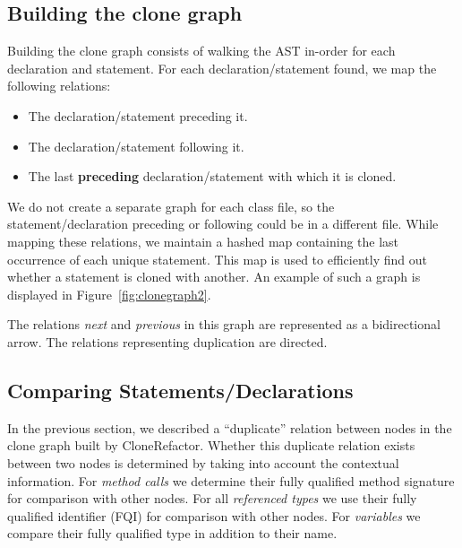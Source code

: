 \documentclass[conference]{IEEEtran}
\begin{document}
\subsection{Building the clone graph}\label{sec:buildingclonegraph}
Building the clone graph consists of walking the AST in-order for each declaration and statement. For each declaration/statement found, we map the following relations:
\begin{itemize}
  \item The declaration/statement preceding it.
  \item The declaration/statement following it.
  \item The last \textbf{preceding} declaration/statement with which it is cloned.
\end{itemize}
We do not create a separate graph for each class file, so the statement/declaration preceding or following could be in a different file. While mapping these relations, we maintain a hashed map containing the last occurrence of each unique statement. This map is used to efficiently find out whether a statement is cloned with another. An example of such a graph is displayed in Figure~\ref{fig:clonegraph2}.


The relations \textit{next} and \textit{previous} in this graph are represented as a bidirectional arrow. The relations representing duplication are directed. %

\subsection{Comparing Statements/Declarations} \label{sec:comparingstuff}
In the previous section, we described a ``duplicate'' relation between nodes in the clone graph built by CloneRefactor. Whether this duplicate relation exists between two nodes is determined by taking into account the contextual information. For \textit{method calls} we determine their fully qualified method signature for comparison with other nodes. For all \textit{referenced types} we use their fully qualified identifier (FQI) for comparison with other nodes. For \textit{variables} we compare their fully qualified type in addition to their name.
\end{document}
